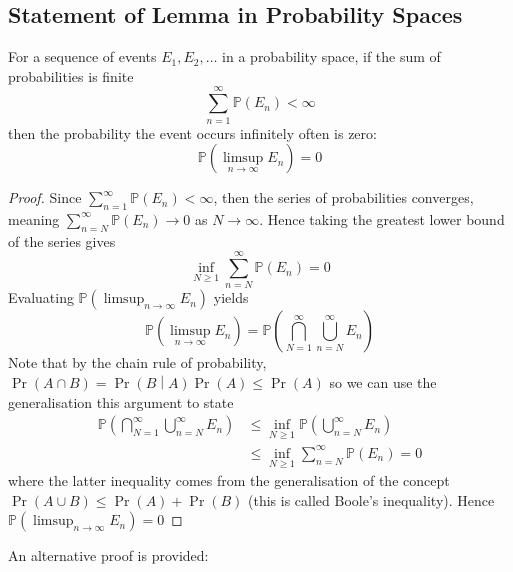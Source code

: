 \documentclass[11pt]{report} %
\begin{document}
\subsection{Statement of Lemma in Probability Spaces}

For a sequence of events $E_{1}, E_{2}, \dots$ in a probability space, if the sum of probabilities is finite
\begin{equation}
\sum_{n = 1}^{\infty}\mathbb{P}\left(E_{n}\right) < \infty
\end{equation}
then the probability the event occurs infinitely often is zero:
\begin{equation}
\mathbb{P}\left(\limsup_{n\to\infty}E_{n}\right) = 0
\end{equation}
\begin{proof}
Since $\sum_{n = 1}^{\infty}\mathbb{P}\left(E_{n}\right) < \infty$, then the series of probabilities converges, meaning $\sum_{n = N}^{\infty}\mathbb{P}\left(E_{n}\right) \to 0$ as $N \to \infty$. Hence taking the greatest lower bound of the series gives
\begin{equation}
\inf_{N \geq 1}\sum_{n = N}^{\infty}\mathbb{P}\left(E_{n}\right) = 0
\end{equation}
Evaluating $\mathbb{P}\left(\limsup_{n\to\infty}E_{n}\right)$ yields
\begin{equation}
\mathbb{P}\left(\limsup_{n\to\infty}E_{n}\right) = \mathbb{P}\left(\bigcap_{N = 1}^{\infty}\bigcup_{n = N}^{\infty}E_{n}\right)
\end{equation}
Note that by the chain rule of probability, $\operatorname{Pr}\left(A \cap B\right) = \operatorname{Pr}\left(B \middle| A\right)\operatorname{Pr}\left(A\right) \leq \operatorname{Pr}\left(A\right)$ so we can use the generalisation this argument to state
\begin{align}
\mathbb{P}\left(\bigcap_{N = 1}^{\infty}\bigcup_{n = N}^{\infty}E_{n}\right) &\leq \inf_{N \geq 1}\mathbb{P}\left(\bigcup_{n = N}^{\infty}E_{n}\right) \\
&\leq \inf_{N \geq 1}\sum_{n = N}^{\infty}\mathbb{P}\left(E_{n}\right) = 0
\end{align}
where the latter inequality comes from the generalisation of the concept $\operatorname{Pr}\left(A \cup B\right) \leq \operatorname{Pr}\left(A\right) + \operatorname{Pr}\left(B\right)$ (this is called Boole's inequality). Hence $\mathbb{P}\left(\limsup_{n\to\infty}E_{n}\right) = 0$
\end{proof}
An alternative proof is provided:
\end{document}

